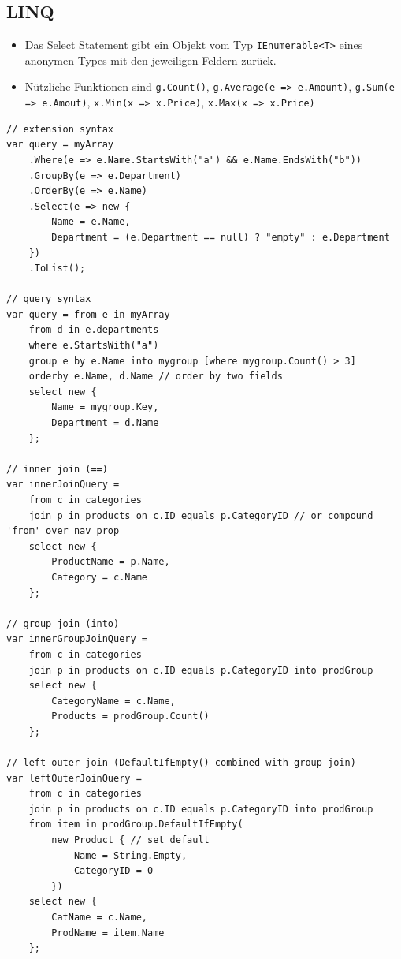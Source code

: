 \subsection{LINQ}
\begin{itemize}
	\item Das Select Statement gibt ein Objekt vom Typ \lstinline|IEnumerable<T>| eines anonymen Types mit den jeweiligen Feldern zurück.
	\item Nützliche Funktionen sind \lstinline|g.Count()|, \lstinline|g.Average(e => e.Amount)|, \lstinline|g.Sum(e => e.Amout)|, \lstinline|x.Min(x => x.Price)|, \lstinline|x.Max(x => x.Price)|
\end{itemize}
\begin{lstlisting}
// extension syntax
var query = myArray
	.Where(e => e.Name.StartsWith("a") && e.Name.EndsWith("b"))
	.GroupBy(e => e.Department)
	.OrderBy(e => e.Name)
	.Select(e => new {
		Name = e.Name,
		Department = (e.Department == null) ? "empty" : e.Department
	})
	.ToList();

// query syntax
var query = from e in myArray
	from d in e.departments
	where e.StartsWith("a")
	group e by e.Name into mygroup [where mygroup.Count() > 3]
	orderby e.Name, d.Name // order by two fields
	select new {
		Name = mygroup.Key,
		Department = d.Name
	};
	
// inner join (==)
var innerJoinQuery =
    from c in categories
    join p in products on c.ID equals p.CategoryID // or compound 'from' over nav prop
    select new { 
	    ProductName = p.Name, 
	    Category = c.Name 
	};
	
// group join (into)
var innerGroupJoinQuery =
    from c in categories
    join p in products on c.ID equals p.CategoryID into prodGroup
    select new { 
	    CategoryName = c.Name, 
	    Products = prodGroup.Count()
	};
	
// left outer join (DefaultIfEmpty() combined with group join)
var leftOuterJoinQuery =
    from c in categories
    join p in products on c.ID equals p.CategoryID into prodGroup
    from item in prodGroup.DefaultIfEmpty(
	    new Product { // set default
		    Name = String.Empty, 
		    CategoryID = 0 
		})
    select new { 
	    CatName = c.Name, 
	    ProdName = item.Name 
	};
\end{lstlisting}

\clearpage

